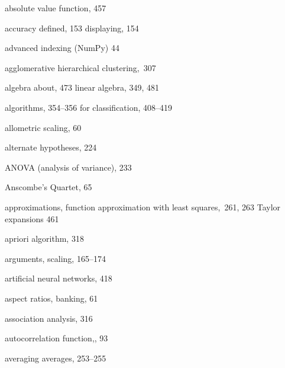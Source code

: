 \documentclass{Oreilly5980006}
\begin{document}
\begin{theindex}
  \indexspace

  \item absolute value function, 457
  \item accuracy
    \subitem defined, 153
    \subitem displaying, 154
  \item advanced indexing  (NumPy) 44
  \item agglomerative hierarchical clustering,~307
  \item algebra
    \subitem about, 473
    \subitem linear algebra, 349, 481
  \item algorithms, 354--356
        \subitem for classification, 408--419
  \item allometric scaling, 60
  \item alternate hypotheses, 224
  \item ANOVA (analysis of variance), 233
  \item Anscombe's Quartet, 65
  \item approximations, function approximation with least squares,~261, 
		263
   \subitem Taylor expansions 461
  \item apriori algorithm, 318
  \item arguments, scaling, 165--174
  \item artificial neural networks, 418
  \item aspect ratios, banking, 61
  \item association analysis, 316
  \item autocorrelation function,, 93
  \item averaging averages, 253--255

  \indexspace


\end{theindex}
\end{document}
